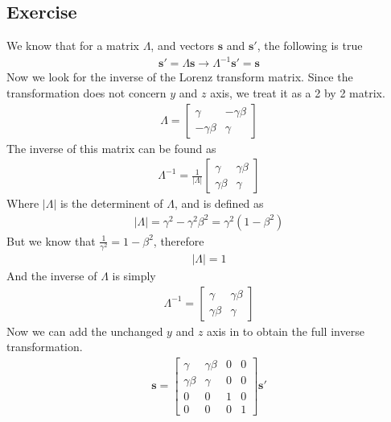 \documentclass[12pt]{memoir}
\newcommand{\paren}[1]{\left( #1 \right)}
\newcommand{\abso}[1]{\left|#1 \right|}
\newcommand{\then}{\rightarrow}
\begin{document}
\subsection{Exercise}
We know that for a matrix $\Lambda$, and vectors $\mathbf{s}$ and $\mathbf{s}'$, the following is true
\begin{align}
\mathbf{s}' = \Lambda\mathbf{s} \then \Lambda^{-1}\mathbf{s}'=\mathbf{s}
\end{align}
Now we look for the inverse of the Lorenz transform matrix. Since the transformation does not concern $y$ and $z$ axis, we treat it as a 2 by 2 matrix.
\begin{align}
\Lambda = \begin{bmatrix}
    \gamma & -\gamma\beta\\
    -\gamma\beta & \gamma
\end{bmatrix}
\end{align}
The inverse of this matrix can be found as
\begin{align}
\Lambda^{-1} = \frac{1}{\abso{\Lambda}}\begin{bmatrix}
    \gamma & \gamma\beta\\
    \gamma\beta & \gamma
\end{bmatrix}
\end{align}
Where $\abso{\Lambda}$ is the determinent of $\Lambda$, and is defined as
\begin{align}
\abso{\Lambda} = \gamma^2 -\gamma^2\beta^2 = \gamma^2\paren{1-\beta^2}
\end{align}
But we know that $\frac{1}{\gamma^2} = 1 - \beta^2$, therefore
\begin{align}
\abso{\Lambda} = 1
\end{align}
And the inverse of $\Lambda$ is simply 
\begin{align}
\Lambda^{-1} =\begin{bmatrix}
    \gamma & \gamma\beta\\
    \gamma\beta & \gamma
\end{bmatrix}
\end{align}
Now we can add the unchanged $y$ and $z$ axis in to obtain the full inverse transformation.
\begin{align}
\mathbf{s} = \begin{bmatrix}
    \gamma & \gamma\beta & 0 & 0\\
    \gamma\beta & \gamma & 0 & 0\\
    0&0&1&0\\
    0&0&0&1
\end{bmatrix}\mathbf{s}'
\end{align}
\end{document}
